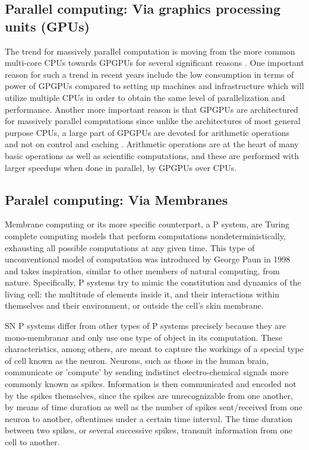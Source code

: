 \documentclass{acm_proc_article-sp}
\begin{document}
\subsection{Parallel computing: Via graphics processing units (GPUs)}
The trend for massively parallel computation is moving from the more common multi-core CPUs towards GPGPUs for several significant reasons \cite{cudabook}\cite{cudaguide}. One important reason for such a trend in recent years include the low consumption in terms of power of GPGPUs compared to setting up machines and infrastructure which will utilize multiple CPUs in order to obtain the same level of parallelization and performance\cite{cudapage}. Another more important reason is that GPGPUs are architectured for massively parallel computations since unlike the architectures of most general purpose CPUs, a large part of GPGPUs are devoted for arithmetic operations and not on control and caching \cite{cudabook}\cite{cudaguide}. Arithmetic operations are at the heart of many basic operations as well as scientific computations, and these are performed with  larger speedups when done in parallel, by GPGPUs over CPUs. 

\subsection{Paralel computing: Via Membranes}
Membrane computing or its more specific counterpart, a P system, are Turing complete computing models that perform computations nondeterministically, exhausting all possible  computations at any given time. This type of unconventional model of computation was introduced by George Paun in 1998 and takes inspiration, similar to other members of natural computing, from nature\cite{introtomem}\cite{ppage}. Specifically, P systems try to mimic the constitution and dynamics of the living cell: the multitude of elements inside it, and their interactions within themselves and their environment, or outside the cell's skin membrane.

SN P systems differ from other types of P systems precisely because they are mono-membranar and only use one type of object in its computation. These characteristics, among others, are meant to capture the workings of a special type of cell known as the neuron. Neurons, such as those in the human brain, communicate or 'compute' by sending indistinct electro-chemical  signals more commonly known as spikes. Information is then communicated and encoded not by the spikes themselves, since the spikes are unrecognizable from one another, by means of time duration as well as the number of spikes sent/received from one neuron to another, oftentimes under a certain time interval\cite{snp}. The time duration between two spikes, or several successive spikes, transmit information from one cell to another.  
\end{document}

